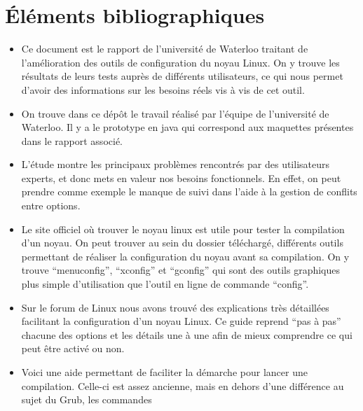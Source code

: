\documentclass[16pts]{report}
\begin{document}

\nocite{*}

\section{Éléments bibliographiques}
\begin{itemize}
    \item Ce document \cite{Waterloo:Etude} est le rapport de l’université de
        Waterloo traitant de l’amélioration des outils de configuration du
        noyau Linux. On y trouve les résultats de leurs tests auprès de
        différents utilisateurs, ce qui nous permet d’avoir des informations
        sur les besoins réels vis à vis de cet outil.
    \item On trouve dans ce dépôt \cite{Waterloo:Github} le travail réalisé par
        l’équipe de l’université de Waterloo. Il y a le prototype en java qui
        correspond aux maquettes présentes dans le rapport associé.
    \item L'étude \cite{Hubaux:2012:USC:2110147.2110164} montre les principaux
        problèmes rencontrés par des utilisateurs experts, et donc mets en
        valeur nos besoins fonctionnels. En effet, on peut prendre comme exemple
        le manque de suivi dans l'aide à la gestion de conflits entre options.
    \item Le site officiel où trouver le noyau linux \cite{Kernel} est utile
        pour tester la compilation d’un noyau. On peut trouver au sein du
        dossier téléchargé, différents outils permettant de réaliser la
        configuration du noyau avant sa compilation. On y trouve “menuconfig”,
        “xconfig” et “gconfig” qui sont des outils graphiques plus simple
        d’utilisation que l’outil en ligne de commande “config”.
    \item Sur le forum de Linux \cite{Existant:Kernel:ForumTutoConfig} nous
        avons trouvé des explications très détaillées facilitant la
        configuration d’un noyau Linux. Ce guide reprend “pas à pas” chacune
        des options et les détails une à une afin de mieux comprendre ce qui
        peut être activé ou non.
    \item Voici une aide \cite{Existant:Kernel:tuto} permettant de faciliter
        la démarche pour lancer une compilation. Celle-ci est assez ancienne,
        mais en dehors d’une différence au sujet du Grub, les commandes

\end{itemize}
\end{document}
